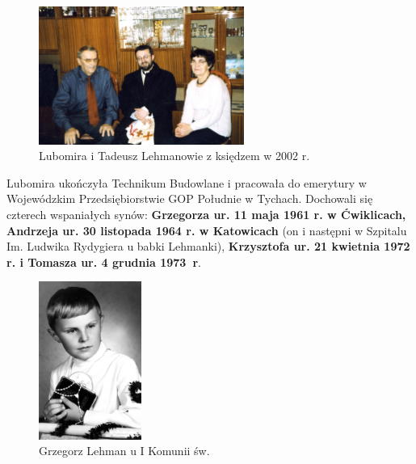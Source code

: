 \begin{figure}[!h]
\begin{center}
\includegraphics[width=0.6\textwidth]{photo/tadeusz_lubomira_lehman_1.jpg}
\caption{Lubomira i Tadeusz Lehmanowie z księdzem w 2002 r.}
\label{rys:tadeusz_lubomira_lehman_1}
\end{center}
\end{figure}

Lubomira ukończyła Technikum Budowlane i pracowała do emerytury w Wojewódzkim Przedsiębiorstwie GOP Południe w Tychach. Dochowali się czterech wspaniałych synów: \textbf{Grzegorza ur. 11 maja 1961 r. w Ćwiklicach, Andrzeja ur. 30 listopada 1964 r. w Katowicach} (on i następni w Szpitalu Im. Ludwika Rydygiera u babki Lehmanki), \textbf{Krzysztofa ur. 21 kwietnia 1972 r. i Tomasza ur. 4 grudnia 1973~r}.

\begin{figure}[!h]
\begin{center}
\includegraphics[width=0.3\textwidth]{photo/grzegorz_lehman.jpg}
\caption{Grzegorz Lehman u I Komunii św.}
\label{rys:grzegorz_lehman}
\end{center}
\end{figure}

